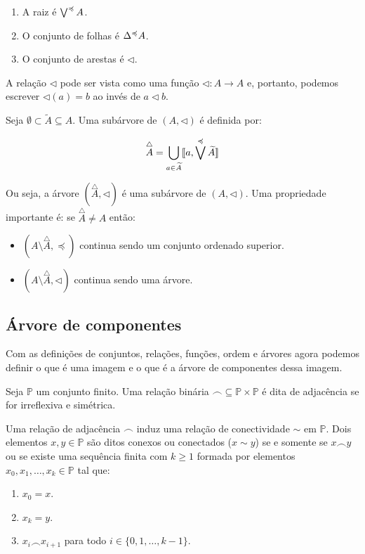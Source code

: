 \begin{enumerate}
    \item A raiz é $\bigvee^{\preccurlyeq} A$.
    \item O conjunto de folhas é $\Delta^{\preccurlyeq} A$.
    \item O conjunto de arestas é $\lhd$.
\end{enumerate}

A relação $\lhd$ pode ser vista como uma função $\lhd : A \rightarrow A$ e,
portanto, podemos escrever $\lhd(a) = b$ ao invés de $a \lhd b$.

Seja $\emptyset \subset \widetilde{A} \subseteq A$. Uma subárvore de $(A, \lhd)$ é definida por:

$$\overset{\triangle}{A} = \bigcup_{a \in \widetilde{A}} \llbracket a,  \bigvee^{\preccurlyeq} \widetilde{A} \rrbracket$$

Ou seja, a árvore $(\overset{\triangle}{A}, \lhd)$ é uma subárvore de
$(A, \lhd)$. Uma propriedade importante é: se $\overset{\triangle}{A} \ne A$
então:

\begin{itemize}
    \item $(A \setminus \overset{\triangle}{A}, \preccurlyeq)$ continua sendo um conjunto ordenado superior.
    \item $(A \setminus \overset{\triangle}{A}, \lhd)$ continua sendo uma árvore.
\end{itemize}

\subsection{Árvore de componentes}

Com as definições de conjuntos, relações, funções, ordem e árvores agora podemos
definir o que é uma imagem e o que é a árvore de componentes dessa imagem.

\begin{definition}
    Seja $\mathbb{P}$ um conjunto finito. Uma relação binária {\Large $\frown$}$\subseteq \mathbb{P} \times \mathbb{P}$
    é dita de adjacência se for irreflexiva e simétrica.
\end{definition}

\begin{definition}
    Uma relação de adjacência {\Large $\frown$} induz uma relação de conectividade $\sim$ em
    $\mathbb{P}$. Dois elementos $x, y \in \mathbb{P}$ são ditos conexos ou conectados ($x \sim y$)
    se e somente se $x \frown y$ ou se existe uma sequência finita com $k \ge 1$
    formada por elementos $x_0, x_1, \dots, x_k \in \mathbb{P}$ tal que:

    \begin{enumerate}
        \item $x_0 = x$.
        \item $x_k = y$.
        \item $x_i \frown x_{i+1}$ para todo $i \in \{0, 1, \dots, k-1\}$.
    \end{enumerate}
\end{definition}

